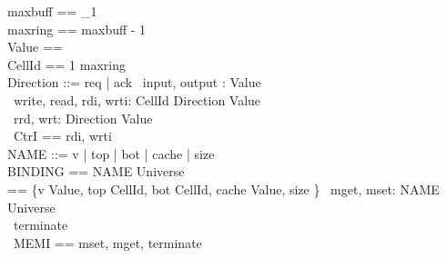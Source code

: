 \documentclass[10pt]{article}
\begin{document}
\begin{circus}
    [Universe]
    \also maxbuff == \nat_1 \\
    \also maxring == maxbuff - 1 \\
    \also Value == \nat \\
    \also CellId == 1 \upto maxring \\
    \also Direction ::=  req | ack
    \also \circchannel\ input, output : Value \\
    \also \circchannel\ write, read, rdi, wrti: CellId \cross Direction \cross Value \\
    \also \circchannel\ rrd, wrt: Direction \cross Value \\
    \also \circchannelset\ CtrI == \lchanset rdi, wrti \rchanset \\
    \also NAME ::= v | top | bot | cache | size \\
    \also BINDING == NAME \fun Universe \\
    \also \delta == \{v \mapsto Value, top \mapsto CellId, bot \mapsto CellId, cache \mapsto Value, size \mapsto \nat \}
    \also \circchannel\ mget, mset: NAME \cross Universe \\
    \also \circchannel\ terminate \\
    \also \circchannelset\ MEMI == \lchanset mset, mget, terminate \rchanset \\
\end{circus}%
\end{document}
